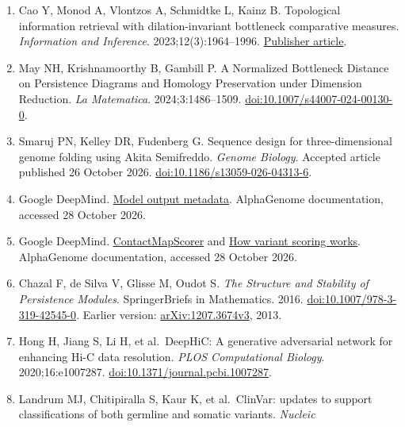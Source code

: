 \documentclass[
  11pt,
]{article}
\begin{document}
\begin{enumerate}
  Bottleneck Distance for Persistence Diagrams. \emph{Proceedings of the
  30th Canadian Conference on Computational Geometry}. 2018:78--84.
  \href{https://donsheehy.net/research/cavanna18computing.pdf}{Primary
  paper}.
\item
  Cao Y, Monod A, Vlontzos A, Schmidtke L, Kainz B. Topological
  information retrieval with dilation-invariant bottleneck comparative
  measures. \emph{Information and Inference}. 2023;12(3):1964--1996.
  \href{https://academic.oup.com/imaiai/article/12/3/1964/7217093}{Publisher
  article}.
\item
  May NH, Krishnamoorthy B, Gambill P. A Normalized Bottleneck Distance
  on Persistence Diagrams and Homology Preservation under Dimension
  Reduction. \emph{La Matematica}. 2024;3:1486--1509.
  \href{https://doi.org/10.1007/s44007-024-00130-0}{doi:10.1007/s44007-024-00130-0}.
\item
  Smaruj PN, Kelley DR, Fudenberg G. Sequence design for
  three-dimensional genome folding using Akita Semifreddo. \emph{Genome
  Biology}. Accepted article published 26 October 2026.
  \href{https://doi.org/10.1186/s13059-026-04313-6}{doi:10.1186/s13059-026-04313-6}.
\item
  Google DeepMind.
  \href{https://www.alphagenomedocs.com/exploring_model_metadata.html}{Model
  output metadata}. AlphaGenome documentation, accessed 28 October 2026.
\item
  Google DeepMind.
  \href{https://www.alphagenomedocs.com/api/generated/alphagenome.models.variant_scorers.ContactMapScorer.html}{ContactMapScorer}
  and \href{https://www.alphagenomedocs.com/variant_scoring.html}{How
  variant scoring works}. AlphaGenome documentation, accessed 28 October
  2026.
\item
  Chazal F, de Silva V, Glisse M, Oudot S. \emph{The Structure and
  Stability of Persistence Modules}. SpringerBriefs in Mathematics.
  2016.
  \href{https://doi.org/10.1007/978-3-319-42545-0}{doi:10.1007/978-3-319-42545-0}.
  Earlier version:
  \href{https://arxiv.org/abs/1207.3674v3}{arXiv:1207.3674v3}, 2013.
\item
  Hong H, Jiang S, Li H, et al.~DeepHiC: A generative adversarial
  network for enhancing Hi-C data resolution. \emph{PLOS Computational
  Biology}. 2020;16:e1007287.
  \href{https://doi.org/10.1371/journal.pcbi.1007287}{doi:10.1371/journal.pcbi.1007287}.
\item
  Landrum MJ, Chitipiralla S, Kaur K, et al.~ClinVar: updates to support
  classifications of both germline and somatic variants. \emph{Nucleic
}
\end{enumerate}
\end{document}
